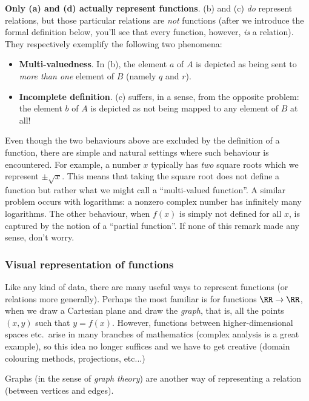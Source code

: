 \textbf{Only (a) and (d) actually represent functions}. (b) and (c) \emph{do} represent relations, but those particular relations are \emph{not} functions (after we introduce the formal definition below, you'll see that every function, however, \emph{is} a relation). They respectively exemplify the following two phenomena:
\begin{itemize}
\item \textbf{Multi-valuedness}. In (b), the element $a$ of $A$ is depicted as being sent to \emph{more than one} element of $B$ (namely $q$ and $r$).
\item \textbf{Incomplete definition}. (c) suffers, in a sense, from the opposite problem: the element $b$ of $A$ is depicted as not being mapped to any element of $B$ at all!
\end{itemize}

\begin{remark}
Even though the two behaviours above are excluded by the definition of a function, there are simple and natural settings where such behaviour is encountered. For example, a number $x$ typically has \emph{two} square roots which we represent $\pm \sqrt{x}$. This means that taking the square root does not define a function but rather what we might call a ``multi-valued function''. A similar problem occurs with logarithms: a nonzero complex number has infinitely many logarithms. The other behaviour, when $f(x)$ is simply not defined for all $x$, is captured by the notion of a ``partial function''. If none of this remark made any sense, don't worry.
\end{remark}

\subsubsection{Visual representation of functions}

Like any kind of data, there are many useful ways to represent functions (or relations more generally). Perhaps the most familiar is for functions $\RR \to \RR$, when we draw a Cartesian plane and draw the \emph{graph}, that is, all the points $(x,y)$ such that $y=f(x)$. However, functions between higher-dimensional spaces etc.\ arise in many branches of mathematics (complex analysis is a great example), so this idea no longer suffices and we have to get creative (domain colouring methods, projections, etc...)

Graphs (in the sense of \emph{graph theory}) are another way of representing a relation (between vertices and edges).

